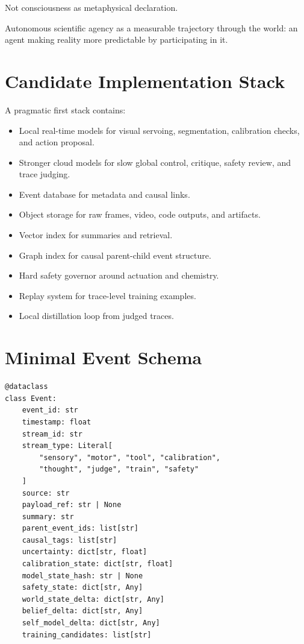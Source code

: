 \documentclass[11pt]{article}
\begin{document}
Not consciousness as metaphysical declaration.

Autonomous scientific agency as a measurable trajectory through the world: an agent making reality more predictable by participating in it.

\newpage
\appendix

\section{Candidate Implementation Stack}

A pragmatic first stack contains:
\begin{itemize}
  \item Local real-time models for visual servoing, segmentation, calibration checks, and action proposal.
  \item Stronger cloud models for slow global control, critique, safety review, and trace judging.
  \item Event database for metadata and causal links.
  \item Object storage for raw frames, video, code outputs, and artifacts.
  \item Vector index for summaries and retrieval.
  \item Graph index for causal parent-child event structure.
  \item Hard safety governor around actuation and chemistry.
  \item Replay system for trace-level training examples.
  \item Local distillation loop from judged traces.
\end{itemize}

\section{Minimal Event Schema}

\begin{lstlisting}
@dataclass
class Event:
    event_id: str
    timestamp: float
    stream_id: str
    stream_type: Literal[
        "sensory", "motor", "tool", "calibration",
        "thought", "judge", "train", "safety"
    ]
    source: str
    payload_ref: str | None
    summary: str
    parent_event_ids: list[str]
    causal_tags: list[str]
    uncertainty: dict[str, float]
    calibration_state: dict[str, float]
    model_state_hash: str | None
    safety_state: dict[str, Any]
    world_state_delta: dict[str, Any]
    belief_delta: dict[str, Any]
    self_model_delta: dict[str, Any]
    training_candidates: list[str]
\end{lstlisting}
\end{document}
